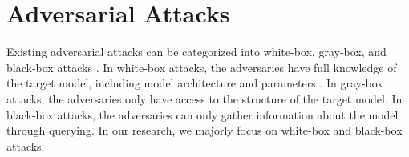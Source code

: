





\clearpage

\section{Adversarial Attacks}
\label{sec:adv_attack}

Existing adversarial attacks can be categorized into white-box, gray-box, and black-box attacks \citep{REN2020346}. In white-box attacks, the adversaries have full knowledge of the target model, including model architecture and parameters \citep{goodfellow2015explaining}. In gray-box attacks, the adversaries only have access to the structure of the target model. In black-box attacks, the adversaries can only gather information about the model through querying. In our research, we majorly focus on white-box and black-box attacks.

